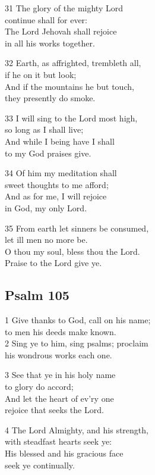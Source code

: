 31 The glory of the mighty Lord\\
continue shall for ever:\\
The Lord Jehovah shall rejoice\\
in all his works together.

32 Earth, as affrighted, trembleth all,\\
if he on it but look;\\
And if the mountains he but touch,\\
they presently do smoke.

33 I will sing to the Lord most high,\\
so long as I shall live;\\
And while I being have I shall\\
to my God praises give.

34 Of him my meditation shall\\
sweet thoughts to me afford;\\
And as for me, I will rejoice\\
in God, my only Lord.

35 From earth let sinners be consumed,\\
let ill men no more be.\\
O thou my soul, bless thou the Lord.\\
Praise to the Lord give ye.

\begin{center}
\quad{}\quad{}
\end{center}

\subsection*{Psalm 105}

1 Give thanks to God, call on his name;\\
to men his deeds make known.\\
2 Sing ye to him, sing psalms; proclaim\\
his wondrous works each one.

3 See that ye in his holy name\\
to glory do accord;\\
And let the heart of ev’ry one\\
rejoice that seeks the Lord.

4 The Lord Almighty, and his strength,\\
with steadfast hearts seek ye:\\
His blessed and his gracious face\\
seek ye continually.

